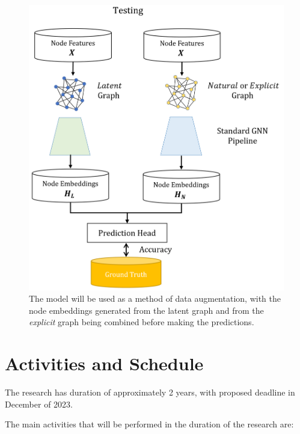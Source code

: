 \documentclass[12pt,a4paper]{article}
\begin{document}
	\begin{figure}[hbtp]
		\centering \includegraphics[scale=0.4]{eval_part3_2.png}
		\caption{The model will be used as a method of data augmentation, with the node embeddings generated from the latent graph and from the \emph{explicit} graph being combined before making the predictions. \label{eval3_2}}
	\end{figure}

	\section{Activities and Schedule}
	\label{sec:Activities_and_schedule}

	The research has duration of approximately 2 years, with proposed deadline in December of 2023. 

	The main activities that will be performed in the duration of the research are:
\end{document}
